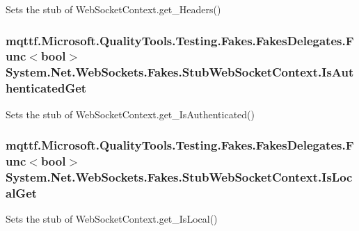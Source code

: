 Sets the stub of Web\-Socket\-Context.\-get\-\_\-\-Headers()

\hypertarget{class_system_1_1_net_1_1_web_sockets_1_1_fakes_1_1_stub_web_socket_context_afdacfc8ed130be5c35ac9db751c8d39b}{
\subsubsection[{Is\-Authenticated\-Get}]{\setlength{\rightskip}{0pt plus 5cm}mqttf.\-Microsoft.\-Quality\-Tools.\-Testing.\-Fakes.\-Fakes\-Delegates.\-Func$<$bool$>$ System.\-Net.\-Web\-Sockets.\-Fakes.\-Stub\-Web\-Socket\-Context.\-Is\-Authenticated\-Get}}\label{class_system_1_1_net_1_1_web_sockets_1_1_fakes_1_1_stub_web_socket_context_afdacfc8ed130be5c35ac9db751c8d39b}


Sets the stub of Web\-Socket\-Context.\-get\-\_\-\-Is\-Authenticated()

\hypertarget{class_system_1_1_net_1_1_web_sockets_1_1_fakes_1_1_stub_web_socket_context_a8612de2bb542a7dcbaa25177a27d3f85}{
\subsubsection[{Is\-Local\-Get}]{\setlength{\rightskip}{0pt plus 5cm}mqttf.\-Microsoft.\-Quality\-Tools.\-Testing.\-Fakes.\-Fakes\-Delegates.\-Func$<$bool$>$ System.\-Net.\-Web\-Sockets.\-Fakes.\-Stub\-Web\-Socket\-Context.\-Is\-Local\-Get}}\label{class_system_1_1_net_1_1_web_sockets_1_1_fakes_1_1_stub_web_socket_context_a8612de2bb542a7dcbaa25177a27d3f85}


Sets the stub of Web\-Socket\-Context.\-get\-\_\-\-Is\-Local()

